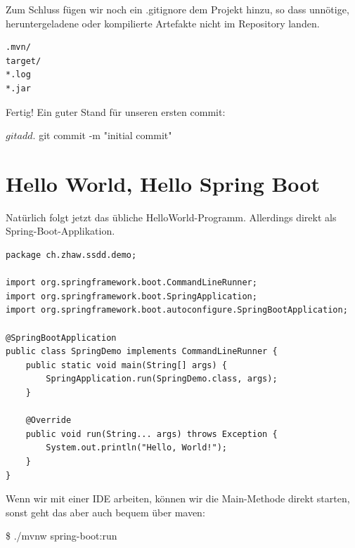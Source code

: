 Zum Schluss fügen wir noch ein .gitignore dem Projekt hinzu, so dass unnötige,
heruntergeladene oder kompilierte Artefakte nicht im Repository landen.

\begin{listing}[H]
\begin{verbatim}
.mvn/
target/
*.log
*.jar
\end{verbatim}
\caption{.gitignore}
\label{lst:gitignore}
\end{listing}

Fertig! Ein guter Stand für unseren ersten commit:

\begin{terminalbox}
\begin{VerbatimBreak}
$ git add .
$ git commit -m "initial commit"
\end{VerbatimBreak}
\end{terminalbox}

\section{Hello World, Hello Spring Boot}
Natürlich folgt jetzt das übliche HelloWorld-Programm. Allerdings direkt
als Spring-Boot-Applikation.

\begin{listing}[H]
\begin{verbatim}
package ch.zhaw.ssdd.demo;

import org.springframework.boot.CommandLineRunner;
import org.springframework.boot.SpringApplication;
import org.springframework.boot.autoconfigure.SpringBootApplication;

@SpringBootApplication
public class SpringDemo implements CommandLineRunner {
    public static void main(String[] args) {
        SpringApplication.run(SpringDemo.class, args);
    }

    @Override
    public void run(String... args) throws Exception {
        System.out.println("Hello, World!");
    }
}
\end{verbatim}
\caption{./src/main/java/ch/zhaw/ssdd/demo/SpringDemo.java}
\label{lst:helloWorld1}
\end{listing}

Wenn wir mit einer IDE arbeiten, können wir die Main-Methode direkt starten,
sonst geht das aber auch bequem über maven:

\begin{terminalbox}
\begin{VerbatimBreak}
\$ ./mvnw spring-boot:run
\end{VerbatimBreak}
\end{terminalbox}

